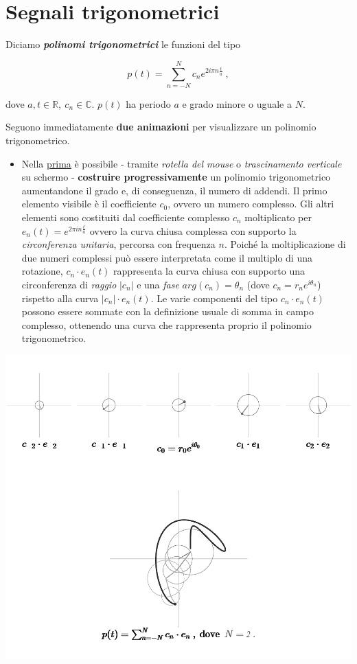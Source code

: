 \documentclass[
]{book}
\providecommand{\tightlist}{%
  \setlength{\itemsep}{0pt}\setlength{\parskip}{0pt}}
\begin{document}
\hypertarget{segntrig}{%
\section{Segnali trigonometrici}\label{segntrig}}

Diciamo \emph{\textbf{polinomi trigonometrici}} le funzioni del tipo

\begin{equation}
  p(t) = \sum_{n=-N}^N c_n e^{2 i \pi n \textstyle \frac {t}{a}} \ ,
  \label{eq:poltrig}
\end{equation}

dove \(a,t \in \mathbb{R}, \ c_n \in \mathbb{C}\). \(p(t)\) ha periodo \(a\) e grado minore o uguale a \(N\).

Seguono immediatamente \textbf{due animazioni} per visualizzare un polinomio trigonometrico.

\begin{itemize}
\tightlist
\item
  Nella \href{https://bradwave.github.io/thesis/\#/animazione-polinomi-trigonometrici}{prima} è possibile - tramite \emph{rotella del mouse} o \emph{trascinamento verticale} su schermo - \textbf{costruire progressivamente} un polinomio trigonometrico aumentandone il grado e, di conseguenza, il numero di addendi.
  Il primo elemento visibile è il coefficiente \(c_0\), ovvero un numero complesso. Gli altri elementi sono costituiti dal coefficiente complesso \(c_n\) moltiplicato per \(e_n(t)=e^{2\pi in\frac{t}{a}}\) ovvero la curva chiusa complessa con supporto la \emph{circonferenza unitaria}, percorsa con frequenza \(n\). Poiché la moltiplicazione di due numeri complessi può essere interpretata come il multiplo di una rotazione, \(c_n \cdot e_n(t)\) rappresenta la curva chiusa con supporto una circonferenza di \emph{raggio} \(|c_n|\) e una \emph{fase} \(arg(c_n)=\theta_n\) (dove \(c_n=r_{n}e^{i\theta_n}\)) rispetto alla curva \(|c_n| \cdot e_n(t)\).
  Le varie componenti del tipo \(c_n \cdot e_n(t)\) possono essere sommate con la definizione usuale di somma in campo complesso, ottenendo una curva che rappresenta proprio il polinomio trigonometrico.
\end{itemize}

\begin{center}\includegraphics[width=0.8\linewidth]{_images/pol-trig} \end{center}
\end{document}
